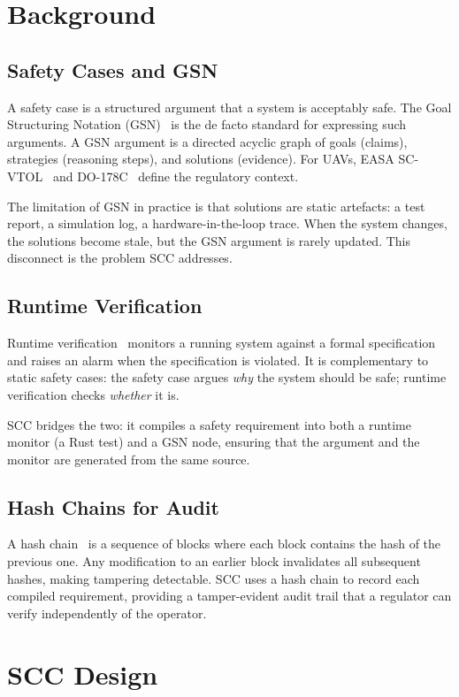 ﻿\section{Background}

\subsection{Safety Cases and GSN}
A safety case is a structured argument that a system is acceptably
safe. The Goal Structuring Notation (GSN)~\cite{kelly1998,kelly2004}
is the de facto standard for expressing such arguments. A GSN
argument is a directed acyclic graph of goals (claims), strategies
(reasoning steps), and solutions (evidence). For UAVs, EASA
SC-VTOL~\cite{easa_sc_vtol} and DO-178C~\cite{do178c} define the
regulatory context.

The limitation of GSN in practice is that solutions are static
artefacts: a test report, a simulation log, a hardware-in-the-loop
trace. When the system changes, the solutions become stale, but the
GSN argument is rarely updated. This disconnect is the problem SCC
addresses.

\subsection{Runtime Verification}
Runtime verification~\cite{bartocci2018} monitors a running system
against a formal specification and raises an alarm when the
specification is violated. It is complementary to static safety
cases: the safety case argues \emph{why} the system should be safe;
runtime verification checks \emph{whether} it is.

SCC bridges the two: it compiles a safety requirement into both a
runtime monitor (a Rust test) and a GSN node, ensuring that the
argument and the monitor are generated from the same source.

\subsection{Hash Chains for Audit}
A hash chain~\cite{crosby2009,merkle1988} is a sequence of blocks
where each block contains the hash of the previous one. Any
modification to an earlier block invalidates all subsequent hashes,
making tampering detectable. SCC uses a hash chain to record each
compiled requirement, providing a tamper-evident audit trail that
a regulator can verify independently of the operator.

\section{SCC Design}

